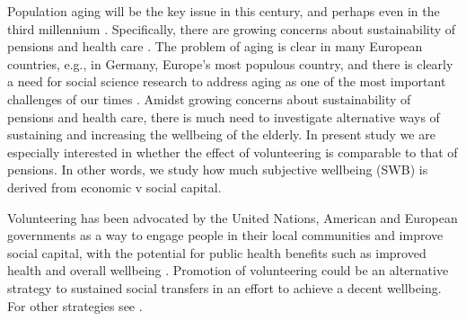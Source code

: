 \documentclass[10pt, letterpaper]{article}
\newcommand{\emd}[1]{\ExecuteMetaData[/tmp/tex]{#1}} %
\begin{document}
\begin{spacing}{1.4} %




Population aging will be the key issue in this century, and perhaps even in 
the third
millennium  \citep{stolnitz1992demographic}. Specifically, there are growing
concerns about sustainability of pensions and health care \citep{jurges12}. 
The problem of aging is clear in many European countries, e.g., in
Germany, Europe's most populous country, and there is clearly a need for social
science research to address aging as one of the most important challenges of our
times \citep{vaupel2006redistributing}. 
%
Amidst growing concerns about sustainability of pensions and health care, there
is much need to investigate alternative ways  of sustaining and increasing  the wellbeing of
the elderly. %
 In present study %
we are especially interested in whether the effect of volunteering is comparable
to that of pensions. In other words, we
study how much subjective wellbeing (SWB) is derived from economic v social capital. 

Volunteering has been advocated by the United Nations, American and European
governments as a way to engage people in their local communities and improve
social capital, with the potential for public health benefits such as improved 
health and overall wellbeing 
\citep{jenkinson2013volunteering}. Promotion of volunteering could be an
alternative 
strategy to sustained social transfers in an effort to achieve a decent
wellbeing.  For other strategies see \citet[][sec. 2.4.5]{ferring10}. 


\end{spacing}
\end{document}
